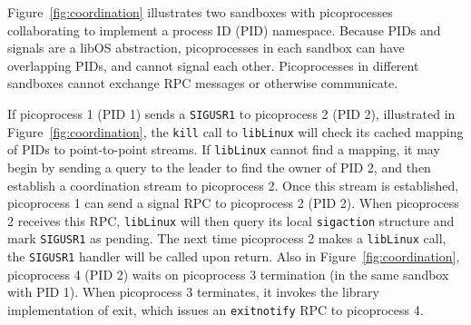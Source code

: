 Figure~\ref{fig:coordination} illustrates two sandboxes with picoprocesses
collaborating to implement a process ID (PID) namespace.  
Because PIDs and signals are a libOS abstraction,
picoprocesses in 
each sandbox can have overlapping PIDs, and
cannot signal each other.
Picoprocesses in different sandboxes cannot 
exchange RPC messages or otherwise communicate.


If picoprocess 1 (PID 1) sends a {\tt SIGUSR1} to picoprocess 2 (PID 2), illustrated in Figure~\ref{fig:coordination},
the {\tt kill} call to {\tt libLinux} will check its cached mapping of PIDs to 
point-to-point streams.
If {\tt libLinux} cannot find a mapping, it may begin by sending a query to the leader
to find the owner of PID 2,
and then establish a coordination stream to picoprocess 2.
Once this stream is established, picoprocess 1 can send a  
signal RPC to picoprocess 2 (PID 2).
When picoprocess 2 receives this RPC, 
{\tt libLinux} will then query its local {\tt sigaction} 
structure and mark {\tt SIGUSR1} as pending.
The next time picoprocess 2 makes a {\tt libLinux} call,
the {\tt SIGUSR1} handler will be called upon return. Also in Figure~\ref{fig:coordination}, picoprocess 4 (PID 2) waits on 
picoprocess 3 termination (in the same sandbox with PID 1). When picoprocess 3 terminates, it invokes the library implementation of exit, which issues
an {\tt exitnotify} RPC to picoprocess 4.


